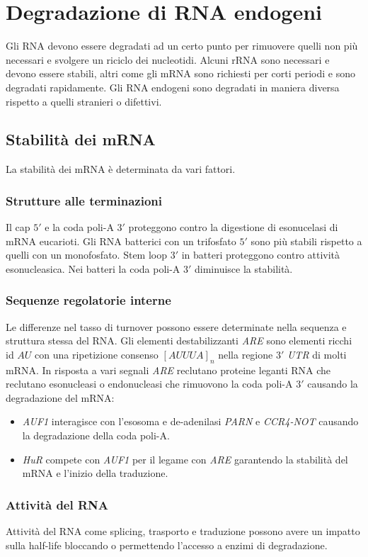 \section{Degradazione di RNA endogeni}
Gli RNA devono essere degradati ad un certo punto per rimuovere quelli non pi\`u necessari e svolgere un riciclo dei nucleotidi. Alcuni rRNA sono necessari e devono essere stabili, 
altri come gli mRNA sono richiesti per corti periodi e sono degradati rapidamente. Gli RNA endogeni sono degradati in maniera diversa rispetto a quelli stranieri o difettivi. 
\subsection{Stabilit\`a dei mRNA}
La stabilit\`a dei mRNA \`e determinata da vari fattori.
\subsubsection{Strutture alle terminazioni}
Il cap $5'$ e la coda poli-A $3'$ proteggono contro la digestione di esonucelasi di mRNA eucarioti. Gli RNA batterici con un trifosfato $5'$ sono pi\`u stabili rispetto a quelli 
con un monofosfato. Stem loop $3'$ in batteri proteggono contro attivit\`a esonucleasica. Nei batteri la coda poli-A $3'$ diminuisce la stabilit\`a. 
\subsubsection{Sequenze regolatorie interne}
Le differenze nel tasso di turnover possono essere determinate nella sequenza e struttura stessa del RNA. Gli elementi destabilizzanti \emph{ARE} sono elementi ricchi id $AU$ con una
ripetizione consenso \emph{$[AUUUA]_n$} nella regione $3'$ \emph{UTR} di molti mRNA. In risposta a vari segnali \emph{ARE} reclutano proteine leganti RNA che reclutano esonucleasi o 
endonucleasi che rimuovono la coda poli-A $3'$ causando la degradazione del mRNA: 
\begin{itemize}
	\item \emph{AUF1} interagisce con l'esosoma e de-adenilasi \emph{PARN} e \emph{CCR4-NOT} causando la degradazione della coda poli-A.
	\item \emph{HuR} compete con \emph{AUF1} per il legame con \emph{ARE} garantendo la stabilit\`a del mRNA e l'inizio della traduzione. 
\end{itemize}
\subsubsection{Attivit\`a del RNA}
Attivit\`a del RNA come splicing, trasporto e traduzione possono avere un impatto sulla half-life bloccando o permettendo l'accesso a enzimi di degradazione. 
